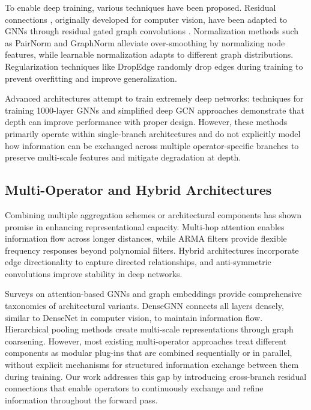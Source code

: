 To enable deep training, various techniques have been proposed. Residual connections \cite{he2016deep}, originally developed for computer vision, have been adapted to GNNs through residual gated graph convolutions \cite{bresson2017residual}. Normalization methods such as PairNorm \cite{zhao2020pair} and GraphNorm \cite{cai2021graphnorm} alleviate over-smoothing by normalizing node features, while learnable normalization \cite{li2022learning} adapts to different graph distributions. Regularization techniques like DropEdge \cite{rong2019dropedge} randomly drop edges during training to prevent overfitting and improve generalization.

Advanced architectures attempt to train extremely deep networks: techniques for training 1000-layer GNNs \cite{li2021training} and simplified deep GCN approaches \cite{oono2020simple} demonstrate that depth can improve performance with proper design. However, these methods primarily operate within single-branch architectures and do not explicitly model how information can be exchanged across multiple operator-specific branches to preserve multi-scale features and mitigate degradation at depth.

\subsection{Multi-Operator and Hybrid Architectures}

Combining multiple aggregation schemes or architectural components has shown promise in enhancing representational capacity. Multi-hop attention \cite{wang2021multi} enables information flow across longer distances, while ARMA filters \cite{bianchi2020graph} provide flexible frequency responses beyond polynomial filters. Hybrid architectures incorporate edge directionality \cite{beaini2020directional, rossi2023edge} to capture directed relationships, and anti-symmetric convolutions \cite{gravina2022anti} improve stability in deep networks.

Surveys on attention-based GNNs \cite{sun2023attention} and graph embeddings \cite{cai2020understanding} provide comprehensive taxonomies of architectural variants. DenseGNN \cite{du2024densegnn} connects all layers densely, similar to DenseNet in computer vision, to maintain information flow. Hierarchical pooling methods \cite{pham2021hierarchical, ying2018hierarchical} create multi-scale representations through graph coarsening. However, most existing multi-operator approaches treat different components as modular plug-ins that are combined sequentially or in parallel, without explicit mechanisms for structured information exchange between them during training. Our work addresses this gap by introducing cross-branch residual connections that enable operators to continuously exchange and refine information throughout the forward pass.

